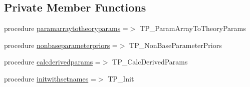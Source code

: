 \subsection*{Private Member Functions}
\begin{DoxyCompactItemize}
\item 
procedure \mbox{\hyperlink{structcosmologyparameterizations_1_1thetaparameterization_a7ac342128930477193ae2400f4458132}{paramarraytotheoryparams}} =$>$ T\+P\+\_\+\+Param\+Array\+To\+Theory\+Params
\item 
procedure \mbox{\hyperlink{structcosmologyparameterizations_1_1thetaparameterization_ab67465121df4059d6e58bdfbb4b29fda}{nonbaseparameterpriors}} =$>$ T\+P\+\_\+\+Non\+Base\+Parameter\+Priors
\item 
procedure \mbox{\hyperlink{structcosmologyparameterizations_1_1thetaparameterization_ac299f73f174fd484e94676546103c66d}{calcderivedparams}} =$>$ T\+P\+\_\+\+Calc\+Derived\+Params
\item 
procedure \mbox{\hyperlink{structcosmologyparameterizations_1_1thetaparameterization_a46ea44de83de46fa2e79b4bc555f4aa8}{initwithsetnames}} =$>$ T\+P\+\_\+\+Init
\end{DoxyCompactItemize}
